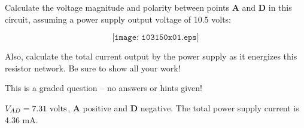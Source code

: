 

Calculate the voltage magnitude and polarity between points {\bf A} and {\bf D} in this circuit, assuming a power supply output voltage of 10.5 volts:

$$\texttt{[image: i03150x01.eps]}$$

Also, calculate the total current output by the power supply as it energizes this resistor network.  Be sure to show all your work!

\vfil 

\eject






This is a graded question -- no answers or hints given!







$V_{AD} = 7.31 \hbox{ volts}$, {\bf A} positive and {\bf D} negative.  The total power supply current is 4.36 mA.




